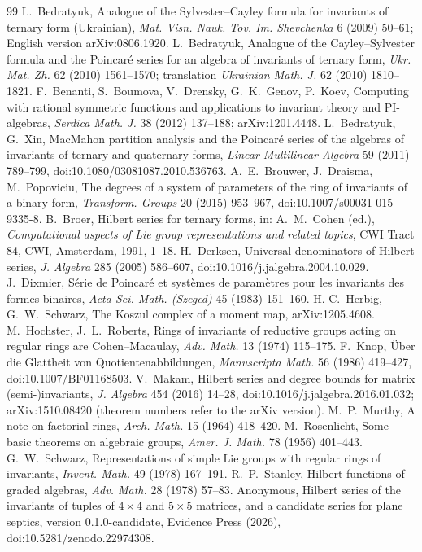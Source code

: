 \documentclass[11pt]{amsart}
\theoremstyle{definition}
\theoremstyle{remark}
\begin{document}
\begin{thebibliography}{99}
 L.~Bedratyuk, Analogue of the Sylvester--Cayley formula for invariants of ternary form (Ukrainian), \emph{Mat. Visn. Nauk. Tov. Im. Shevchenka} 6 (2009) 50--61; English version arXiv:0806.1920.
 L.~Bedratyuk, Analogue of the Cayley--Sylvester formula and the Poincar\'e series for an algebra of invariants of ternary form, \emph{Ukr. Mat. Zh.} 62 (2010) 1561--1570; translation \emph{Ukrainian Math. J.} 62 (2010) 1810--1821.
 F.~Benanti, S.~Boumova, V.~Drensky, G.~K.~Genov, P.~Koev, Computing with rational symmetric functions and applications to invariant theory and PI-algebras, \emph{Serdica Math. J.} 38 (2012) 137--188; arXiv:1201.4448.
 L.~Bedratyuk, G.~Xin, MacMahon partition analysis and the Poincar\'e series of the algebras of invariants of ternary and quaternary forms, \emph{Linear Multilinear Algebra} 59 (2011) 789--799, doi:10.1080/03081087.2010.536763.
 A.~E.~Brouwer, J.~Draisma, M.~Popoviciu, The degrees of a system of parameters of the ring of invariants of a binary form, \emph{Transform. Groups} 20 (2015) 953--967, doi:10.1007/s00031-015-9335-8.
 B.~Broer, Hilbert series for ternary forms, in: A.~M.~Cohen (ed.), \emph{Computational aspects of Lie group representations and related topics}, CWI Tract 84, CWI, Amsterdam, 1991, 1--18.
 H.~Derksen, Universal denominators of Hilbert series, \emph{J. Algebra} 285 (2005) 586--607, doi:10.1016/j.jalgebra.2004.10.029.
 J.~Dixmier, S\'erie de Poincar\'e et syst\`emes de param\`etres pour les invariants des formes binaires, \emph{Acta Sci. Math. (Szeged)} 45 (1983) 151--160.
 H.-C.~Herbig, G.~W.~Schwarz, The Koszul complex of a moment map, arXiv:1205.4608.
 M.~Hochster, J.~L.~Roberts, Rings of invariants of reductive groups acting on regular rings are Cohen--Macaulay, \emph{Adv. Math.} 13 (1974) 115--175.
 F.~Knop, \"Uber die Glattheit von Quotientenabbildungen, \emph{Manuscripta Math.} 56 (1986) 419--427, doi:10.1007/BF01168503.
 V.~Makam, Hilbert series and degree bounds for matrix (semi-)invariants, \emph{J. Algebra} 454 (2016) 14--28, doi:10.1016/j.jalgebra.2016.01.032; arXiv:1510.08420 (theorem numbers refer to the arXiv version).
 M.~P.~Murthy, A note on factorial rings, \emph{Arch. Math.} 15 (1964) 418--420.
 M.~Rosenlicht, Some basic theorems on algebraic groups, \emph{Amer. J. Math.} 78 (1956) 401--443.
 G.~W.~Schwarz, Representations of simple Lie groups with regular rings of invariants, \emph{Invent. Math.} 49 (1978) 167--191.
 R.~P.~Stanley, Hilbert functions of graded algebras, \emph{Adv. Math.} 28 (1978) 57--83.
 Anonymous, Hilbert series of the invariants of tuples of $4\times4$ and $5\times5$ matrices, and a candidate series for plane septics, version 0.1.0-candidate, Evidence Press (2026), doi:10.5281/zenodo.22974308.
\end{thebibliography}
\end{document}
